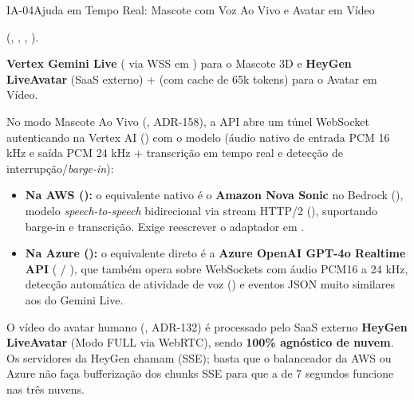 \begin{pecaarq}{IA-04}{Ajuda em Tempo Real: Mascote com Voz Ao Vivo e Avatar em Vídeo}{\sgcp~\nativo\enspace\saws~\equivalente\enspace\sazure~\nativo}
\begin{campos}
  \item[Código na API]  (, , , ).
  \item[Serviços atuais] \textbf{Vertex Gemini Live} ( via WSS em ) para o Mascote 3D e \textbf{HeyGen LiveAvatar} (SaaS externo) +  (com cache de 65k tokens) para o Avatar em Vídeo.
  \item[Mascote 3D (Voz)] No modo Mascote Ao Vivo (, ADR-158), a API abre um túnel WebSocket autenticando na Vertex AI () com o modelo \textbf{} (áudio nativo de entrada PCM 16 kHz e saída PCM 24 kHz + transcrição em tempo real e detecção de interrupção/\emph{barge-in}):
  \begin{itemize}
    \item \textbf{Na AWS (\equivalente):} o equivalente nativo é o \textbf{Amazon Nova Sonic} no Bedrock (), modelo \emph{speech-to-speech} bidirecional via stream HTTP/2 (), suportando barge-in e transcrição. Exige reescrever o adaptador em .
    \item \textbf{Na Azure (\nativo):} o equivalente direto é a \textbf{Azure OpenAI GPT-4o Realtime API} ( / ), que também opera sobre WebSockets com áudio PCM16 a 24 kHz, detecção automática de atividade de voz () e eventos JSON muito similares aos do Gemini Live.
  \end{itemize}
  \item[Avatar em Vídeo] O vídeo do avatar humano (, ADR-132) é processado pelo SaaS externo \textbf{HeyGen LiveAvatar} (Modo FULL via WebRTC), sendo \textbf{100\% agnóstico de nuvem}. Os servidores da HeyGen chamam  (SSE); basta que o balanceador da AWS ou Azure não faça bufferização dos chunks SSE para que a  de 7 segundos funcione nas três nuvens.
\end{campos}
\end{pecaarq}

